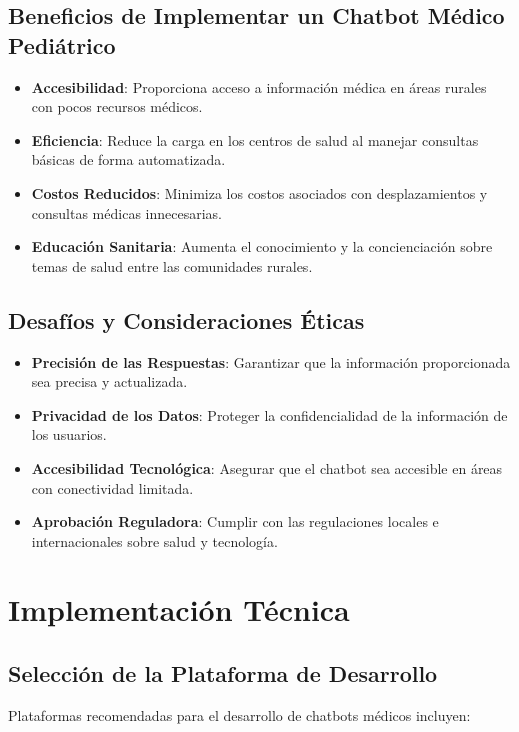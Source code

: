 \subsection{Beneficios de Implementar un Chatbot Médico Pediátrico}

\begin{itemize}
    \item \textbf{Accesibilidad}: Proporciona acceso a información médica en áreas rurales con pocos recursos médicos.
    \item \textbf{Eficiencia}: Reduce la carga en los centros de salud al manejar consultas básicas de forma automatizada.
    \item \textbf{Costos Reducidos}: Minimiza los costos asociados con desplazamientos y consultas médicas innecesarias.
    \item \textbf{Educación Sanitaria}: Aumenta el conocimiento y la concienciación sobre temas de salud entre las comunidades rurales.
\end{itemize}

\subsection{Desafíos y Consideraciones Éticas}

\begin{itemize}
    \item \textbf{Precisión de las Respuestas}: Garantizar que la información proporcionada sea precisa y actualizada.
    \item \textbf{Privacidad de los Datos}: Proteger la confidencialidad de la información de los usuarios.
    \item \textbf{Accesibilidad Tecnológica}: Asegurar que el chatbot sea accesible en áreas con conectividad limitada.
    \item \textbf{Aprobación Reguladora}: Cumplir con las regulaciones locales e internacionales sobre salud y tecnología.
\end{itemize}

\section{Implementación Técnica}

\subsection{Selección de la Plataforma de Desarrollo}

Plataformas recomendadas para el desarrollo de chatbots médicos incluyen:

